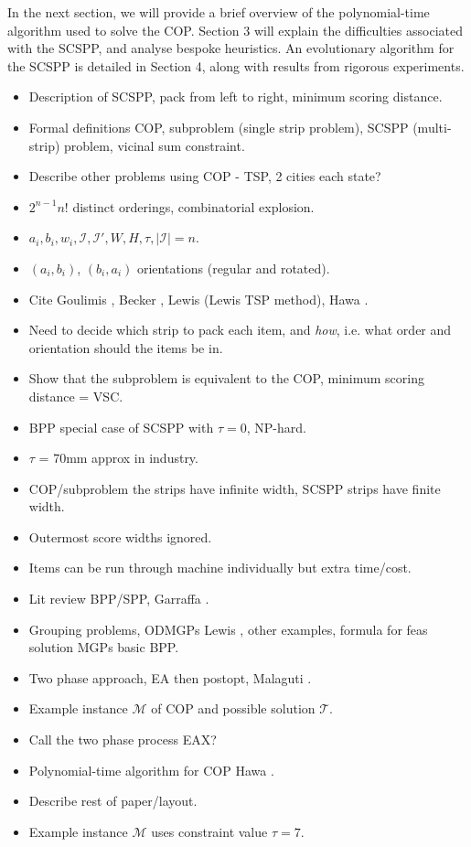 \documentclass{elsarticle}
\begin{document}
In the next section, we will provide a brief overview of the polynomial-time algorithm used to solve the COP. Section 3 will explain the difficulties associated with the SCSPP, and analyse bespoke heuristics. An evolutionary algorithm for the SCSPP is detailed in Section 4, along with results from rigorous experiments.  

{\color{Orange}
\begin{itemize}
	\item Description of SCSPP, pack from left to right, minimum scoring distance.
	\item Formal definitions COP, subproblem (single strip problem), SCSPP (multi-strip) problem, vicinal sum constraint.
	\item Describe other problems using COP - TSP, 2 cities each state?
	\item $2^{n-1} n!$ distinct orderings, combinatorial explosion.
	\item $a_i, b_i, w_i, \mathcal{I}, \mathcal{I}', W, H, \tau, |\mathcal{I}| = n$.
	\item $(a_i, b_i)$, $(b_i, a_i)$ orientations (regular and rotated).
	\item Cite Goulimis \cite{goulimis2004}, Becker \cite{becker2015}, Lewis \cite{lewis2011} (Lewis TSP method), Hawa \cite{hawa2018}.
	\item Need to decide which strip to pack each item, and \emph{how}, i.e. what order and orientation should the items be in.
	\item Show that the subproblem is equivalent to the COP, minimum scoring distance = VSC.
	\item BPP special case of SCSPP with $\tau = 0$, NP-hard.
	\item $\tau$ = 70mm approx in industry. 
	\item COP/subproblem the strips have infinite width, SCSPP strips have finite width.
	\item Outermost score widths ignored.
	\item Items can be run through machine individually but extra time/cost.
	\item Lit review BPP/SPP, Garraffa \cite{garraffa2016}.
	\item Grouping problems, ODMGPs Lewis \cite{lewis2009}, other examples, formula for feas solution MGPs basic BPP.
	\item Two phase approach, EA then postopt, Malaguti \cite{malaguti2008}.
	\item Example instance $\mathcal{M}$ of COP and possible solution $\mathcal{T}$.
	\item Call the two phase process EAX?
	\item Polynomial-time algorithm for COP Hawa \cite{hawa2018}.
	\item Describe rest of paper/layout.
	\item Example instance $\mathcal{M}$ uses constraint value $\tau = 7$.
\end{itemize}
}
\end{document}
